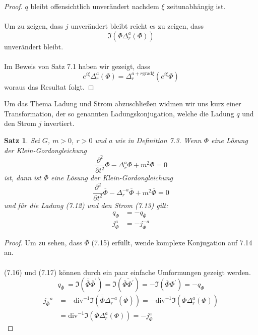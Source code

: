 \documentclass[11pt,a4paper,leqno]{report}
\newtheorem{proposition}{Satz}[chapter]
\numberwithin{equation}{chapter}
\begin{document}
\begin{proof}
	$q$ bleibt offensichtlich unver\"andert nachdem $\xi$ zeitunabh\"angig ist.\\
	\\
	Um zu zeigen, dass $j$ unver\"andert bleibt reicht es zu zeigen, dass $$\Im(\overline{\Phi}\Delta^a_r(\Phi))$$ unver\"andert bleibt.\\
	\\
	Im Beweis von Satz 7.1 haben wir gezeigt, dass 
	\begin{equation*}
		e^{i\xi}\Delta_r^a(\Phi) = \Delta_r^{a + r\text{grad}\xi}(e^{i\xi}\Phi)
	\end{equation*}
	woraus das Resultat folgt.
\end{proof}
\noindent
Um das Thema Ladung und Strom abzuschlie\ss{}en widmen wir uns kurz einer Transformation, der so genannten Ladungskonjugation, welche die Ladung $q$ und den Strom $j$ invertiert. 
\begin{proposition}
	Sei $G$, $m>0$, $r>0$ und $a$ wie in Definition 7.3. Wenn $\Phi$ eine L\"osung der Klein-Gordongleichung
	\begin{equation}
		\frac{\partial^2}{\partial t^2}\Phi - \Delta^{a}_r\Phi+ m^2 \Phi = 0
	\end{equation}
	ist, dann ist $\overline{\Phi}$ eine L\"osung der Klein-Gordongleichung
	\begin{equation}
		\frac{\partial^2}{\partial t^2}\overline{\Phi} - \Delta^{-a}_r\overline{\Phi}+ m^2 \overline{\Phi} = 0
	\end{equation}
	und f\"ur die Ladung (7.12) und den Strom (7.13) gilt:
	\begin{align}
		q_\Phi &= - q_{\overline{\Phi}}\\
		j_\Phi^a &= - j_{\overline{\Phi}}^{-a}
	\end{align}
\end{proposition}
\begin{proof}
	Um zu sehen, dass $\overline{\Phi}$ (7.15) erf\"ullt, wende komplexe Konjugation auf 7.14 an.\\
	\\
	(7.16) und (7.17) k\"onnen durch ein paar einfache Umformungen gezeigt werden.
	\begin{equation*}
		q_{\overline{\Phi}}\ = \Im(\overline{\overline{\Phi}}\overline{\Phi}^\prime)
		= \Im(\overline{\overline{\Phi}\Phi^\prime}) = -\Im(\overline{\Phi}\Phi^\prime)
		= -q_\Phi
	\end{equation*}
	\begin{align*}
		j_{\overline{\Phi}}^{-a} &= -\text{div}^{-1}\Im(\overline{\overline{\Phi}}\Delta^{-a}_r(\overline{\Phi}))
		= -\text{div}^{-1}\Im(\overline{\overline{\Phi}\Delta^a_r(\Phi)})\\
		&= \text{div}^{-1}\Im(\overline{\Phi}\Delta^a_r(\Phi))= -j_{\Phi}^a
	\end{align*}
\end{proof}
\end{document}
